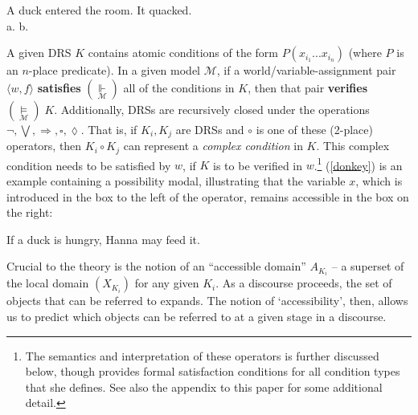 	\pex A duck entered the room. It quacked.\\
		a.  \hspace*{1in}	b. 

	\xe
	

\vspace{1em}

A given DRS $ K $ contains atomic conditions of the form $ P(x_{i_1}...x_{i_n}) $ (where $ P $ is an $ n $-place predicate). In a given model $ \mathcal M $, if a world/variable-assignment pair $ \langle w,f\rangle $ \textbf{satisfies} $ (\underset{\scriptscriptstyle{\mathcal M}}{\boldsymbol{\Vdash}}) $ all of the conditions in $ K $, then that pair \textbf{verifies} $(\underset{\scriptscriptstyle{\mathcal M}}{\boldsymbol{\vDash}}) \;K$. Additionally, DRSs are recursively closed under the operations $ \neg,\bigvee,\Rightarrow,\square,\lozenge $. That is, if $ K_i,K_j $ are DRSs and $ \circ $ is one of these (2-place) operators, then $ K_i\circ K_j $ can represent a \textit{complex condition} in $ K $. This complex condition needs to be satisfied by $ w $, if $ K $ is to be verified in $ w $.\footnote{The semantics and interpretation of these operators is further discussed below, though \citet[714]{Roberts1989} provides formal satisfaction conditions for all condition types that she defines. See also the appendix to this paper for some additional detail.} (\ref{donkey}) is an example containing a possibility modal, illustrating that the variable $x$, which is introduced in the box to the left of the operator, remains accessible in the box on the right: 


\ex \label{donkey} \label{drs-if} If a duck is hungry, Hanna may feed it. \\
\xe

Crucial to the theory is the notion of an ``accessible domain'' $ A_{K_i} $ -- a superset of the local domain $ (X_{K_i}) $ for any given $ K_i $. As a discourse proceeds, the set of objects that can be referred to expands. The notion of `accessibility', then, allows us to predict which objects can be referred to at a given stage in a discourse. 

